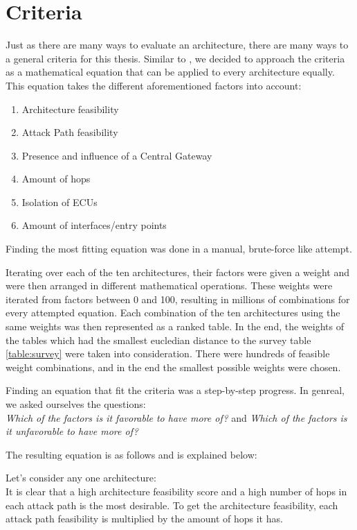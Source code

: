 \chapter{Criteria}
\label{chp:criteria}

Just as there are many ways to evaluate an architecture, there are many ways to a general criteria for this thesis.
Similar to \cite{threat_surf}, we decided to approach the criteria as a mathematical equation that can be applied to every architecture equally.
This equation takes the different aforementioned factors into account:

\begin{enumerate}
    \item Architecture feasibility
    \item Attack Path feasibility
    \item Presence and influence of a Central Gateway
    \item Amount of hops 
    \item Isolation of ECUs
    \item Amount of interfaces/entry points
\end{enumerate}

Finding the most fitting equation was done in a manual, brute-force like attempt.

Iterating over each of the ten architectures, their factors were given a weight and were then arranged in different mathematical operations.
These weights were iterated from factors between 0 and 100, resulting in millions of combinations for every attempted equation.
Each combination of the ten architectures using the same weights was then represented as a ranked table. 
In the end, the weights of the tables which had the smallest eucledian distance to the survey table \ref{table:survey} were taken into consideration.
There were hundreds of feasible weight combinations, and in the end the smallest possible weights were chosen.

Finding an equation that fit the criteria was a step-by-step progress.
In genreal, we asked ourselves the questions:\\
\textit{Which of the factors is it favorable to have more of?} and \textit{Which of the factors is it unfavorable to have more of?}

The resulting equation is as follows and is explained below:

Let's consider any one architecture:\\
It is clear that a high architecture feasibility score and a high number of hops in each attack path is the most desirable.
To get the architecture feasibility, each attack path feasibility is multiplied by the amount of hops it has.
 
